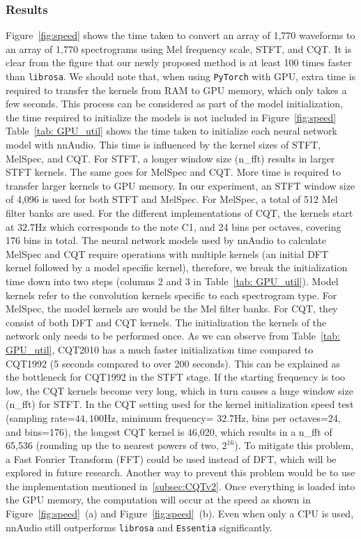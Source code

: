 \documentclass{ieeeaccess}
\newcommand{\nbh}[1]{\texttt{#1}}
\begin{document}
\subsubsection{Results}
Figure~\ref{fig:speed} shows the time taken to convert an array of 1,770 waveforms to an array of 1,770 spectrograms using Mel frequency scale, STFT, and CQT. It is clear from the figure that our newly proposed method is at least 100 times faster than \nbh{librosa}. We should note that, when using \nbh{PyTorch} with GPU, extra time is required to transfer the kernels from RAM to GPU memory, which only takes a few seconds. This process can be considered as part of the model initialization, the time required to initialize the models is not included in Figure~\ref{fig:speed} Table~\ref{tab: GPU_util} shows the time taken to initialize each neural network model with nnAudio. This time is influenced by the kernel sizes of STFT, MelSpec, and CQT. For STFT, a longer window size (n\_fft) results in larger STFT kernels. The same goes for MelSpec and CQT. More time is required to transfer larger kernels to GPU memory. In our experiment, an STFT window size of 4,096 is used for both STFT and MelSpec. For MelSpec, a total of 512 Mel filter banks are used. For the different implementations of CQT, the kernels start at $32.7$Hz which corresponds to the note C1, and 24 bins per octaves, covering 176 bins in total. The neural network models used by nnAudio to calculate MelSpec and CQT require operations with multiple kernels (an initial DFT kernel followed by a model specific kernel), therefore, we break the initialization time down into two steps (columns 2 and 3 in Table~\ref{tab: GPU_util}). Model kernels refer to the convolution kernels specific to each spectrogram type. For MelSpec, the model kernels are would be the Mel filter banks. For CQT, they consist of both DFT and CQT kernels. The initialization the kernels of the network only needs to be performed once. As we can observe from Table~\ref{tab: GPU_util}, CQT2010 has a much faster initialization time compared to CQT1992 (5 seconds compared to over 200 seconds). This can be explained as the bottleneck for CQT1992 in the STFT stage. If the starting frequency is too low, the CQT kernels become very long, which in turn causes a huge window size (n\_fft) for STFT. In the CQT setting used for the kernel initialization speed test (sampling rate=$44,100$Hz, minimum frequency= $32.7$Hz, bins per octaves=24, and bins=176), the longest CQT kernel is 46,020, which results in a n\_fft of 65,536 (rounding up the to nearest powers of two, $2^{16}$). To mitigate this problem, a Fast Fourier Transform (FFT) could be used instead of DFT, which will be explored in future research. Another way to prevent this problem would be to use the implementation mentioned in~\ref{subsec:CQTv2}. Once everything is loaded into the GPU memory, the computation will occur at the speed as shown in Figure~\ref{fig:speed}~(a) and Figure~\ref{fig:speed}~(b). Even when only a CPU is used, nnAudio still outperforms \nbh{librosa} and \nbh{Essentia} significantly. 
\end{document}
